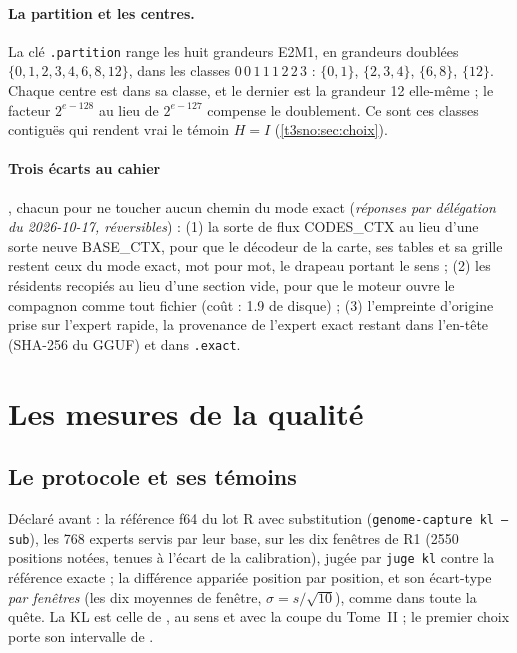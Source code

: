\paragraph{La partition et les centres.} La clé \texttt{.partition} range les huit grandeurs E2M1, en grandeurs doublées $\{0, 1, 2, 3, 4, 6, 8, 12\}$, dans les classes $0\,0\,1\,1\,1\,2\,2\,3$ : $\{0, 1\}$, $\{2, 3, 4\}$, $\{6, 8\}$, $\{12\}$. Chaque centre est dans sa classe, et le dernier est la grandeur 12 elle-même ; le facteur $2^{e-128}$ au lieu de $2^{e-127}$ compense le doublement. Ce sont ces classes contiguës qui rendent vrai le témoin $H = I$ (\cref{t3sno:sec:choix}).

\paragraph{Trois écarts au cahier}, chacun pour ne toucher aucun chemin du mode exact (\emph{réponses par délégation du 2026-10-17, réversibles}) : (1) la sorte de flux CODES\_CTX au lieu d'une sorte neuve BASE\_CTX, pour que le décodeur de la carte, ses tables et sa grille restent ceux du mode exact, mot pour mot, le drapeau portant le sens ; (2) les résidents recopiés au lieu d'une section vide, pour que le moteur ouvre le compagnon comme tout fichier (coût : \SI{1.9}{\Go} de disque) ; (3) l'empreinte d'origine prise sur l'expert rapide, la provenance de l'expert exact restant dans l'en-tête (SHA-256 du GGUF) et dans \texttt{.exact}.

\section{Les mesures de la qualité}\label{t3sno:sec:mesures}

\subsection{Le protocole et ses témoins}\label{t3sno:sec:protocole}

Déclaré avant : la référence f64 du lot R avec substitution (\texttt{genome-capture kl --sub}), les 768 experts servis par leur base, sur les dix fenêtres de R1 (\num{2550} positions notées, tenues à l'écart de la calibration), jugée par \texttt{juge kl} contre la référence exacte ; la différence appariée position par position, et son écart-type \emph{par fenêtres} (les dix moyennes de fenêtre, $\sigma = s/\sqrt{10}$), comme dans toute la quête. La KL est celle de \textcite{kullback1951}, au sens et avec la coupe du Tome~II ; le premier choix porte son intervalle de \textcite{wilson1927}.

